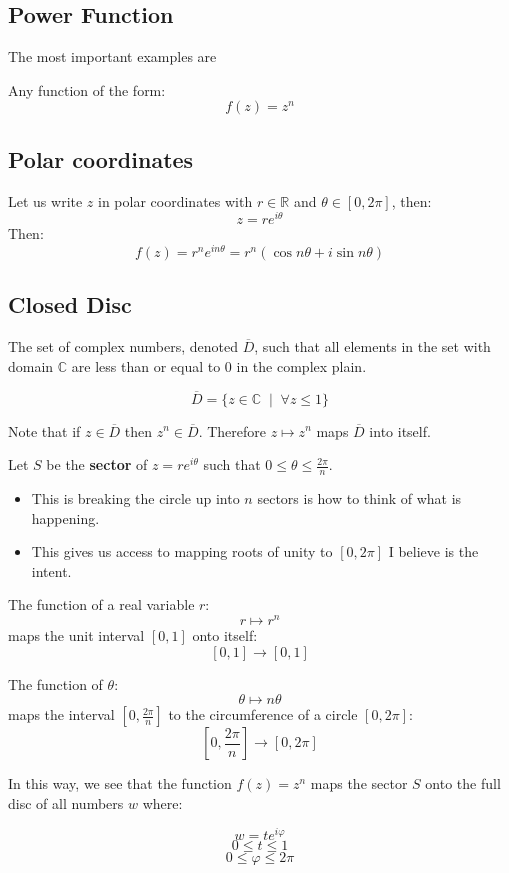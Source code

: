 \subsection{Power Function}
The most important examples are 
\begin{defn}
Any function of the form:
	\[f(z) = z^n\]
\end{defn}
\subsection{Polar coordinates}
Let us write $z$ in polar coordinates with $r \in \mathbb{R}$ and $\theta \in [0, 2\pi]$, then:
\[ z = re^{i\theta}\]
Then:
\[f(z) = r^ne^{in\theta} = r^n(\cos{n\theta} + i\sin{n\theta})\]

\subsection{Closed Disc}
The set of complex numbers, denoted $\overline{D}$, such that all elements in the set with domain $\mathbb{C}$ are less than or equal to $0$ in the complex plain.
\begin{defn}
	\[\overline{D} = \{z \in \mathbb{C} \;\;|\;\; \forall z \leq 1 \} \]
\end{defn}
Note that if $z \in \overline{D}$ then $z^n \in \overline{D}$. Therefore $z \mapsto z^n$ maps $\overline{D}$ into itself.

Let $S$ be the \textbf{sector} of $z = re^{i\theta}$ such that $0 \leq \theta \leq \frac{2\pi}{n}.$ 
\begin{itemize}
	\item This is breaking the circle up into $n$ sectors is how to think of what is happening. 
	\item This gives us access to mapping roots of unity to $[0, 2\pi]$ I believe is the intent.
\end{itemize}

The function of a real variable $r$:
\[r \mapsto r^n \]
maps the unit interval $[0, 1]$ onto itself:
\[[0, 1] \to [0, 1] \]

The function of $\theta$:
\[\theta \mapsto n\theta \]
maps the interval $[0, \frac{2\pi}{n}]$ to the circumference of a circle $[0, 2\pi]$:
\[ [0, \frac{2\pi}{n}] \to [0, 2\pi] \]

In this way, we see that the function $f(z) = z^n$ maps the sector $S$ onto the full disc of all numbers $w$ where:

\[w = te^{i\varphi} \]
\[0 \leq t \leq 1\]
\[0 \leq \varphi \leq 2\pi \]


